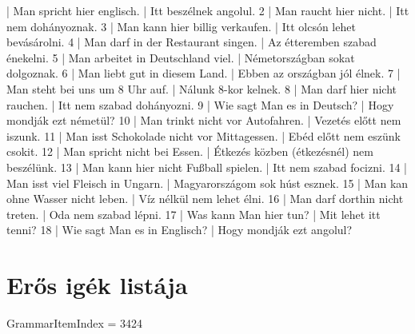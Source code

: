 \documentclass{article}
\newenvironment{exmp}{\verbatim}{\endverbatim}
\begin{document}
\begin{exmp}
1 | Man spricht hier englisch. | Itt beszélnek angolul.
2 | Man raucht hier nicht. | Itt nem dohányoznak.
3 | Man kann hier billig verkaufen. | Itt olcsón lehet bevásárolni.
4 | Man darf in der Restaurant singen. | Az étteremben szabad énekelni.
5 | Man arbeitet in Deutschland viel. | Németországban sokat dolgoznak.
6 | Man liebt gut in diesem Land. | Ebben az országban jól élnek.
7 | Man steht bei uns um 8 Uhr auf. | Nálunk 8-kor kelnek.
8 | Man darf hier nicht rauchen. | Itt nem szabad dohányozni.
9 | Wie sagt Man es in Deutsch? | Hogy mondják ezt németül?
10 | Man trinkt nicht vor Autofahren. | Vezetés előtt nem iszunk.
11 | Man isst Schokolade nicht vor Mittagessen. | Ebéd előtt nem eszünk csokit.
12 | Man spricht nicht bei Essen. | Étkezés közben (étkezésnél) nem beszélünk.
13 | Man kann hier nicht Fußball spielen. | Itt nem szabad focizni.
14 | Man isst viel Fleisch in Ungarn. | Magyarországom sok húst esznek.
15 | Man kan ohne Wasser nicht leben. | Víz nélkül nem lehet élni.
16 | Man darf dorthin nicht treten. | Oda nem szabad lépni.
17 | Was kann Man hier tun? | Mit lehet itt tenni?
18 | Wie sagt Man es in Englisch? | Hogy mondják ezt angolul?
\end{exmp}

\section{Erős igék listája}

GrammarItemIndex = 3424
\end{document}
